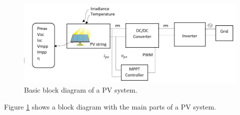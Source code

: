 \begin{figure}[htbp]
	\includegraphics[width=\linewidth]{../Pictures/pv_systemPDF}
	\caption{Basic block diagram of a PV system.}
	\label{fig:PVsystemblocks}
\end{figure}

Figure \ref{fig:PVsystemblocks} shows a block diagram with the main parts of a PV system.
